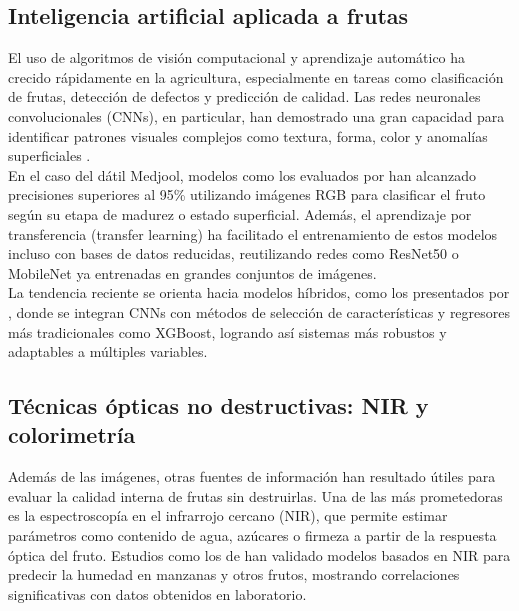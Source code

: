 \subsection{Inteligencia artificial aplicada a frutas}

El uso de algoritmos de visión computacional y aprendizaje automático ha crecido rápidamente en la agricultura, especialmente en tareas como clasificación de frutas, detección de defectos y predicción de calidad. Las redes neuronales convolucionales (CNNs), en particular, han demostrado una gran capacidad para identificar patrones visuales complejos como textura, forma, color y anomalías superficiales \parencite{albarrak_deep_2022, alsirhani_novel_2023}.\\

En el caso del dátil Medjool, modelos como los evaluados por \parencite{almomen_date_2023} han alcanzado precisiones superiores al 95\% utilizando imágenes RGB para clasificar el fruto según su etapa de madurez o estado superficial. Además, el aprendizaje por transferencia (transfer learning) ha facilitado el entrenamiento de estos modelos incluso con bases de datos reducidas, reutilizando redes como ResNet50 o MobileNet ya entrenadas en grandes conjuntos de imágenes.\\

La tendencia reciente se orienta hacia modelos híbridos, como los presentados por \parencite{said_smartripen_2025}, donde se integran CNNs con métodos de selección de características y regresores más tradicionales como XGBoost, logrando así sistemas más robustos y adaptables a múltiples variables.\\

\subsection{Técnicas ópticas no destructivas: NIR y colorimetría}

Además de las imágenes, otras fuentes de información han resultado útiles para evaluar la calidad interna de frutas sin destruirlas. Una de las más prometedoras es la espectroscopía en el infrarrojo cercano (NIR), que permite estimar parámetros como contenido de agua, azúcares o firmeza a partir de la respuesta óptica del fruto. Estudios como los de \parencite{chen_prediction_2024, wang_improving_2025} han validado modelos basados en NIR para predecir la humedad en manzanas y otros frutos, mostrando correlaciones significativas con datos obtenidos en laboratorio.\\


